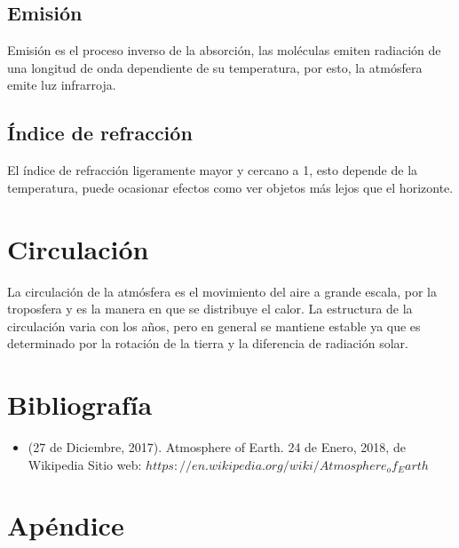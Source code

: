 \documentclass[11pt]{article}
\begin{document}
    \subsection{Emisión}
    Emisión es el proceso inverso de la absorción, las moléculas emiten radiación de una longitud de onda dependiente de su temperatura, por esto, la atmósfera emite luz infrarroja. 
    
    \subsection{Índice de refracción}
    	El índice de refracción ligeramente mayor y cercano a 1, esto depende de la temperatura, puede ocasionar efectos como ver objetos más lejos que el horizonte.

\section{Circulación}

La circulación de la atmósfera es el movimiento del aire a grande escala, por la troposfera y es la manera en que se distribuye el calor. La estructura de la circulación varia con los años, pero en general se mantiene estable ya que es determinado por la rotación de la tierra y la diferencia de radiación solar.

\section*{Bibliografía}
\begin{itemize}
\item (27 de Diciembre, 2017). Atmosphere of Earth. 24 de Enero, 2018, de Wikipedia Sitio web: $https://en.wikipedia.org/wiki/Atmosphere_of_Earth$
\end{itemize}

\section*{Apéndice}
\end{document}
